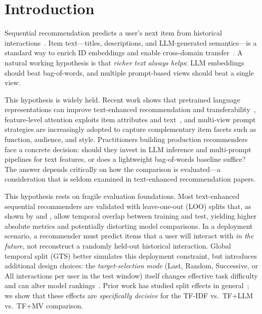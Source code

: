 \documentclass[sigconf,natbib=true,anonymous]{acmart}
\newcommand{\tfidf}{\textsc{TF-IDF}\xspace}
\newcommand{\tfllm}{\textsc{TF+LLM}\xspace}
\newcommand{\tfmv}{\textsc{TF+MV}\xspace}
\begin{document}

\maketitle

\section{Introduction}
\label{sec:intro}

Sequential recommendation predicts a user's next item from historical interactions~\cite{kang2018sasrec,sun2019bert4rec,hidasi2016gru4rec}.
Item text---titles, descriptions, and LLM-generated semantics---is a standard way to enrich ID embeddings and enable cross-domain transfer~\cite{hou2022unisrec,bao2023tallrec}.
A natural working hypothesis is that \emph{richer text always helps}: LLM embeddings should beat bag-of-words, and multiple prompt-based views should beat a single view.

This hypothesis is widely held.
Recent work shows that pretrained language representations can improve text-enhanced recommendation and transferability~\cite{hou2022unisrec,li2023recformer,bao2023tallrec}, feature-level attention exploits item attributes and text~\cite{zhang2019fdsa}, and multi-view prompt strategies are increasingly adopted to capture complementary item facets such as function, audience, and style.
Practitioners building production recommenders face a concrete decision: should they invest in LLM inference and multi-prompt pipelines for text features, or does a lightweight bag-of-words baseline suffice?
The answer depends critically on how the comparison is evaluated---a consideration that is seldom examined in text-enhanced recommendation papers.

This hypothesis rests on fragile evaluation foundations.
Most text-enhanced sequential recommenders are validated with leave-one-out (LOO) splits that, as shown by \citet{ji2023evaluation} and \citet{sun2023reevaluation}, allow temporal overlap between training and test, yielding higher absolute metrics and potentially distorting model comparisons.
In a deployment scenario, a recommender must predict items that a user will interact with \emph{in the future}, not reconstruct a randomly held-out historical interaction.
Global temporal split (GTS) better simulates this deployment constraint, but introduces additional design choices: the \emph{target-selection mode} (Last, Random, Successive, or All interactions per user in the test window) itself changes effective task difficulty and can alter model rankings~\cite{gusak2025time}.
Prior work has studied split effects in general~\cite{meng2020temporal,ji2023evaluation}; we show that these effects are \emph{specifically decisive} for the \tfidf vs.\ \tfllm vs.\ \tfmv comparison.
\end{document}
